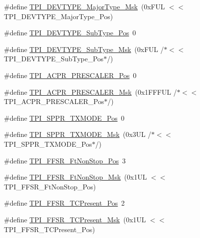 \begin{DoxyCompactItemize}
\item 
\#define \hyperlink{group___c_m_s_i_s___t_p_i_gaecbceed6d08ec586403b37ad47b38c88}{T\+P\+I\+\_\+\+D\+E\+V\+T\+Y\+P\+E\+\_\+\+Major\+Type\+\_\+\+Msk}~(0x\+F\+U\+L $<$$<$ T\+P\+I\+\_\+\+D\+E\+V\+T\+Y\+P\+E\+\_\+\+Major\+Type\+\_\+\+Pos)
\item 
\#define \hyperlink{group___c_m_s_i_s___t_p_i_ga0c799ff892af5eb3162d152abc00af7a}{T\+P\+I\+\_\+\+D\+E\+V\+T\+Y\+P\+E\+\_\+\+Sub\+Type\+\_\+\+Pos}~0
\item 
\#define \hyperlink{group___c_m_s_i_s___t_p_i_ga5b2fd7dddaf5f64855d9c0696acd65c1}{T\+P\+I\+\_\+\+D\+E\+V\+T\+Y\+P\+E\+\_\+\+Sub\+Type\+\_\+\+Msk}~(0x\+F\+U\+L /$\ast$$<$$<$ T\+P\+I\+\_\+\+D\+E\+V\+T\+Y\+P\+E\+\_\+\+Sub\+Type\+\_\+\+Pos$\ast$/)
\item 
\#define \hyperlink{group___c_m_s_i_s___t_p_i_ga5a82d274eb2df8b0c92dd4ed63535928}{T\+P\+I\+\_\+\+A\+C\+P\+R\+\_\+\+P\+R\+E\+S\+C\+A\+L\+E\+R\+\_\+\+Pos}~0
\item 
\#define \hyperlink{group___c_m_s_i_s___t_p_i_ga4fcacd27208419929921aec8457a8c13}{T\+P\+I\+\_\+\+A\+C\+P\+R\+\_\+\+P\+R\+E\+S\+C\+A\+L\+E\+R\+\_\+\+Msk}~(0x1\+F\+F\+F\+U\+L /$\ast$$<$$<$ T\+P\+I\+\_\+\+A\+C\+P\+R\+\_\+\+P\+R\+E\+S\+C\+A\+L\+E\+R\+\_\+\+Pos$\ast$/)
\item 
\#define \hyperlink{group___c_m_s_i_s___t_p_i_ga0f302797b94bb2da24052082ab630858}{T\+P\+I\+\_\+\+S\+P\+P\+R\+\_\+\+T\+X\+M\+O\+D\+E\+\_\+\+Pos}~0
\item 
\#define \hyperlink{group___c_m_s_i_s___t_p_i_gaca085c8a954393d70dbd7240bb02cc1f}{T\+P\+I\+\_\+\+S\+P\+P\+R\+\_\+\+T\+X\+M\+O\+D\+E\+\_\+\+Msk}~(0x3\+U\+L /$\ast$$<$$<$ T\+P\+I\+\_\+\+S\+P\+P\+R\+\_\+\+T\+X\+M\+O\+D\+E\+\_\+\+Pos$\ast$/)
\item 
\#define \hyperlink{group___c_m_s_i_s___t_p_i_ga9537b8a660cc8803f57cbbee320b2fc8}{T\+P\+I\+\_\+\+F\+F\+S\+R\+\_\+\+Ft\+Non\+Stop\+\_\+\+Pos}~3
\item 
\#define \hyperlink{group___c_m_s_i_s___t_p_i_gaaa313f980974a8cfc7dac68c4d805ab1}{T\+P\+I\+\_\+\+F\+F\+S\+R\+\_\+\+Ft\+Non\+Stop\+\_\+\+Msk}~(0x1\+U\+L $<$$<$ T\+P\+I\+\_\+\+F\+F\+S\+R\+\_\+\+Ft\+Non\+Stop\+\_\+\+Pos)
\item 
\#define \hyperlink{group___c_m_s_i_s___t_p_i_gad30fde0c058da2ffb2b0a213be7a1b5c}{T\+P\+I\+\_\+\+F\+F\+S\+R\+\_\+\+T\+C\+Present\+\_\+\+Pos}~2
\item 
\#define \hyperlink{group___c_m_s_i_s___t_p_i_ga0d6bfd263ff2fdec72d6ec9415fb1135}{T\+P\+I\+\_\+\+F\+F\+S\+R\+\_\+\+T\+C\+Present\+\_\+\+Msk}~(0x1\+U\+L $<$$<$ T\+P\+I\+\_\+\+F\+F\+S\+R\+\_\+\+T\+C\+Present\+\_\+\+Pos)
$$
\end{DoxyCompactItemize}
